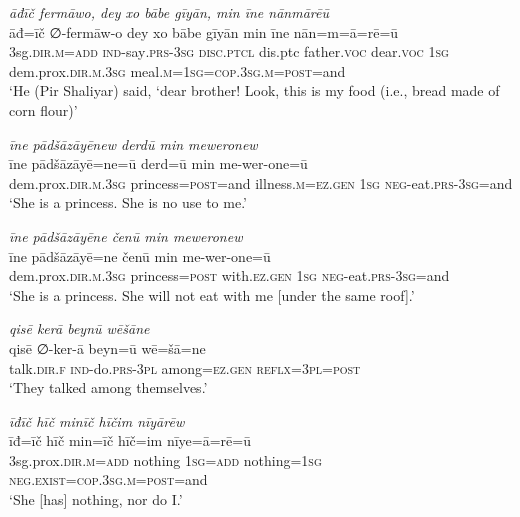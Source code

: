 \ea \label{ZP.101}
\textit{āđīč fermāwo, dey xo bābe gīyān, min īne nānmārēū} \\ 
\gll āđ=īč ∅-fermāw-o dey xo bābe gīyān min īne nān=m=ā=rē=ū \\ 
 3sg\textsc{.dir}\textsc{.m}\textsc{=add} \textsc{ind-}say\textsc{.prs}\textsc{-3sg} \textsc{disc.ptcl} dis.ptc father.\textsc{voc} dear.\textsc{voc} \textsc{1sg} dem.prox\textsc{.dir}\textsc{.m}\textsc{.3sg} meal\textsc{.m}\textsc{=\textsc{1sg}}\textsc{=cop}\textsc{.3sg}\textsc{.m}\textsc{=\textsc{post}}=and \\ 
\glt `He (Pir Shaliyar) said, ‘dear brother! Look, this is my food (i.e., bread made of corn flour)'
\z 
 
\ea \label{ZP.102}
\textit{īne pādšāzāyēnew derdū min meweronew} \\ 
\gll īne pādšāzāyē=ne=ū derd=ū min me-wer-one=ū \\ 
 dem.prox\textsc{.dir}\textsc{.m}\textsc{.3sg} princess\textsc{=\textsc{post}}=and illness\textsc{.m}\textsc{\textsc{=ez.gen}} \textsc{1sg} \textsc{neg-}eat\textsc{.prs}\textsc{-3sg}=and \\ 
\glt `She is a princess. She is no use to me.'
\z 
 
\ea \label{ZP.104}
\textit{īne pādšāzāyēne čenū min meweronew} \\ 
\gll īne pādšāzāyē=ne čenū min me-wer-one=ū \\ 
 dem.prox\textsc{.dir}\textsc{.m}\textsc{.3sg} princess\textsc{=\textsc{post}} with\textsc{.ez.gen} \textsc{1sg} \textsc{neg-}eat\textsc{.prs}\textsc{-3sg}=and \\ 
\glt `She is a princess. She will not eat with me [under the same roof].'
\z 
 
\ea \label{ZP.114}
\textit{qisē kerā beynū wēšāne} \\ 
\gll qisē ∅-ker-ā beyn=ū wē=šā=ne \\ 
 talk\textsc{.dir}\textsc{.f} \textsc{ind-}do\textsc{.prs}\textsc{-3pl} among\textsc{\textsc{=ez.gen}} \textsc{reflx}\textsc{=3pl}\textsc{=\textsc{post}} \\ 
\glt `They talked among themselves.'
\z 
 
\ea \label{ZP.117}
\textit{īđīč hīč minīč hīčim nīyārēw} \\ 
\gll īđ=īč hīč min=īč hīč=im nīye=ā=rē=ū \\ 
 3sg.prox\textsc{.dir}\textsc{.m}\textsc{=add} nothing \textsc{1sg}\textsc{=add} nothing\textsc{=\textsc{1sg}} \textsc{\textsc{neg.}exist}\textsc{=cop}\textsc{.3sg}\textsc{.m}\textsc{=\textsc{post}}=and \\ 
\glt `She [has] nothing, nor do I.'
\z 
 
